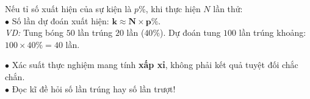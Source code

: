 \documentclass[14pt,a4paper,oneside]{extbook}
\begin{document}
\noindent
\begin{minipage}[t]{0.54\textwidth}
  \begin{tcolorbox}[
    enhanced,
    title={\footnotesize\bfseries\color{white}\faLineChart\ Dạng toán dự đoán số lần xuất hiện},
    colback=green!3!white,
    colframe=green!60!black,
    arc=2.5mm, boxrule=0.8pt, top=1.8mm, bottom=1.8mm, left=2.2mm, right=2.2mm
  ]
    \footnotesize
    Nếu tỉ số xuất hiện của sự kiện là $p\%$, khi thực hiện $N$ lần thử:\\
    $\bullet$ Số lần dự đoán xuất hiện: $\mathbf{k \approx N \times p\%}$.\\
    \textit{VD:} Tung bóng $50$ lần trúng $20$ lần ($40\%$). Dự đoán tung $100$ lần trúng khoảng: $100 \times 40\% = 40$ lần.
  \end{tcolorbox}
\end{minipage}%
\hfill
\begin{minipage}[t]{0.44\textwidth}
  \begin{tcolorbox}[
    enhanced,
    title={\footnotesize\bfseries\color{white}\faExclamationTriangle\ Mẹo tránh bẫy trắc nghiệm},
    colback=red!2!white,
    colframe=red!70!black,
    arc=2.5mm, boxrule=0.8pt, top=1.8mm, bottom=1.8mm, left=2.2mm, right=2.2mm
  ]
    \footnotesize
    $\bullet$ Xác suất thực nghiệm mang tính \textbf{xấp xỉ}, không phải kết quả tuyệt đối chắc chắn.\\
    $\bullet$ Đọc kĩ đề hỏi số lần trúng hay số lần trượt!
  \end{tcolorbox}
\end{minipage}
\end{document}
